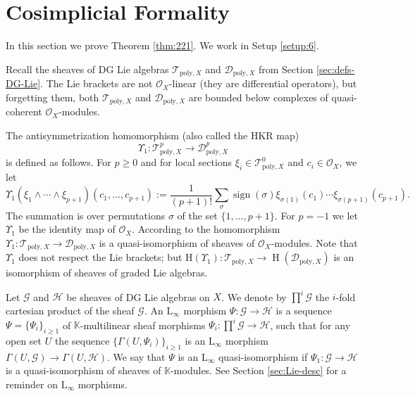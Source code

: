 \documentclass[a4paper, 10pt]{amsart}
\theoremstyle{definition}
\numberwithin{equation}{section}
\newcommand{\opn}{\operatorname}
\newcommand{\mcal}[1]{\mathcal{#1}}
\newcommand{\mrm}[1]{\mathrm{#1}}
\newcommand{\mbb}[1]{\mathbb{#1}}
\newcommand{\smfrac}[2]{\textstyle \frac{#1}{#2}}
\newcommand{\boprod}{\prod\nolimits}
\newcommand{\K}{\mbb{K}}
\begin{document}
\section{Cosimplicial Formality}
\label{sec:cosim-form}

In this section we prove Theorem \ref{thm:221}. We work in Setup
\ref{setup:6}.

Recall the sheaves of DG Lie algebras 
$\mcal{T}_{\mrm{poly}, X}$ and 
$\mcal{D}_{\mrm{poly}, X}$ from Section \ref{sec:defs-DG-Lie}. 
The Lie brackets are not $\mcal{O}_X$-linear (they are differential operators),
but forgetting them, both $\mcal{T}_{\mrm{poly}, X}$ and 
$\mcal{D}_{\mrm{poly}, X}$ are bounded below complexes of quasi-coherent 
$\mcal{O}_X$-modules.

The antisymmetrization homomorphism (also called the HKR map)
\begin{equation} \label{eqn:TDQ.120}
\Upsilon_1 : \mcal{T}^p_{\mrm{poly}, X} \to \mcal{D}^p_{\mrm{poly}, X}
\end{equation}
is defined as follows. For $p \geq 0$ and for local sections 
$\xi_i \in \mcal{T}^0_{\mrm{poly}, X}$ and $c_i \in \mcal{O}_X$, we let
\[ \Upsilon_1(\xi_1 \wedge \cdots \wedge \xi_{p+1})(c_1, \ldots, c_{p+1}) :=
{\smfrac{1}{(p+1)!}} \sum_{\sigma} \opn{sign}(\sigma)
\xi_{\sigma(1)}(c_1) \cdots \xi_{\sigma(p+1)}(c_{p+1}) . \]
The summation is over permutations $\sigma$ of the set
$\{ 1, \ldots, p+1 \}$. 
For $p = -1$ we let $\Upsilon_1$ be the identity map of $\mcal{O}_X$. 
According to \cite[Corollary 4.12]{Ye2} the homomorphism
$\Upsilon_1 : \mcal{T}_{\mrm{poly}, X} \to \mcal{D}_{\mrm{poly}, X}$
is a quasi-isomorphism of sheaves of $\mcal{O}_X$-modules. Note that
$\Upsilon_1$ does not respect the Lie brackets; but
$\mrm{H}(\Upsilon_1) : \mcal{T}_{\mrm{poly}, X} \to 
\opn{H} (\mcal{D}_{\mrm{poly}, X})$
is an isomorphism of sheaves of graded Lie algebras. 

Let $\mcal{G}$ and $\mcal{H}$ be sheaves of DG Lie algebras on
$X$. We denote by $\boprod^i \mcal{G}$ the $i$-fold cartesian product of the
sheaf $\mcal{G}$. An $\mrm{L}_{\infty}$ morphism
$\Psi : \mcal{G} \to \mcal{H}$ is a sequence
$\Psi = \{ \Psi_i \}_{i \geq 1}$ of $\K$-multilinear
sheaf morphisms $\Psi_i : \boprod^i \mcal{G} \to \mcal{H}$, 
such that for any open set $U$ the sequence
$\{ \Gamma(U, \Psi_i) \}_{i \geq 1}$ is an $\mrm{L}_{\infty}$ morphism
$\Gamma(U, \mcal{G}) \to \Gamma(U, \mcal{H})$. 
We say that $\Psi$ is an $\mrm{L}_{\infty}$ quasi-isomorphism if 
$\Psi_1 : \mcal{G} \to \mcal{H}$ is a quasi-isomorphism of sheaves of
$\K$-modules. See Section \ref{sec:Lie-desc} for a reminder on
$\mrm{L}_{\infty}$ morphisms.
\end{document}

